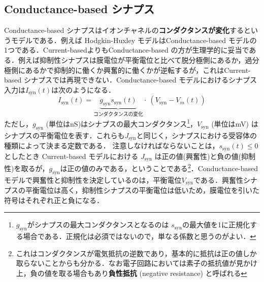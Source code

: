 \subsection{Conductance-based シナプス
}
Conductance-based シナプスはイオンチャネルの\textbf{コンダクタンスが変化}するというモデルである．例えば Hodgkin-Huxley モデルはConductance-based モデルの1つである．Current-basedよりもConductance-based の方が生理学的に妥当である．例えば抑制性シナプスは膜電位が平衡電位と比べて脱分極側にあるか，過分極側にあるかで抑制的に働くか興奮的に働くかが逆転するが，これはCurrent-based シナプスでは再現できない．Conductance-based モデルにおけるシナプス入力は$I_{\text{syn}}(t)$は次のようになる． 
\begin{equation}
I_{\text{syn}}(t)=\underbrace{g_{\text{syn}}s_{\text{syn}}(t)}_{コンダクタンスの変化}\cdot\ \left(V_{\text{syn}}-V_{m}(t)\right)    
\end{equation}
ただし，$g_{\text{syn}}$ (単位はnS)はシナプスの最大コンダクタンス\footnote{$g_{\text{syn}}$がシナプスの最大コンダクタンスとなるのは $s_{\text{syn}}$の最大値を1に正規化する場合である．正規化は必須ではないので，単なる係数と思うのがよい．}，$V_{\text{syn}}$ (単位はmV) はシナプスの平衡電位を表す．これらも$J_{\text{syn}}$と同じく，シナプスにおける受容体の種類によって決まる定数である．
注意しなければならないことは，$s_{\text{syn}}(t)\leq 0$としたとき Current-based モデルにおける $J_{\text{syn}}$ は正の値(興奮性)と負の値(抑制性)を取るが，$g_{\text{syn}}$は正の値のみである，ということである\footnote{これはコンダクタンスが電気抵抗の逆数であり，基本的に抵抗は正の値しか取らないことからも分かる．なお電子回路においては素子の抵抗値が見かけ上，負の値を取る場合もあり\textbf{負性抵抗} (negative resistance) と呼ばれる}．Conductance-basedモデルで興奮性と抑制性を決定しているのは，平衡電位$V_{\text{syn}}$である．興奮性シナプスの平衡電位は高く，抑制性シナプスの平衡電位は低いため，膜電位を引いた符号はそれぞれ正と負になる．
